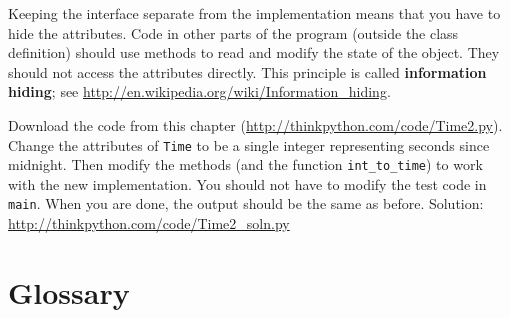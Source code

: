 \documentclass[10pt]{book}
\begin{document}
Keeping the interface separate from the implementation means that
you have to hide the attributes.  Code in other parts of the program
(outside the class definition) should use methods to read
and modify the state of the object.  They should not access the
attributes directly.  This principle is called {\bf information hiding};
see \url{http://en.wikipedia.org/wiki/Information_hiding}.

\begin{exercise}

Download the code from this chapter
(\url{http://thinkpython.com/code/Time2.py}).  Change the attributes
of {\tt Time} to be a single integer representing seconds since
midnight.  Then modify the methods (and the function
\verb"int_to_time") to work with the new implementation.  You should
not have to modify the test code in {\tt main}.  When you are done,
the output should be the same as before.  Solution:
\url{http://thinkpython.com/code/Time2_soln.py}

\end{exercise}


\section{Glossary}
\end{document}
